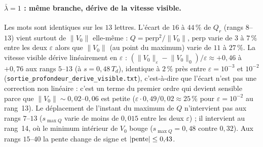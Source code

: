 \documentclass[11pt,a4paper]{article}
\theoremstyle{remark}
\newcommand{\norm}[1]{\lVert #1\rVert}
\begin{document}
\paragraph{$\bar\lambda=1$ : m\^eme branche, d\'erive de la vitesse visible.} Les mots sont identiques sur les $13$ lettres. L'\'ecart de $16$ \`a $44\,\%$ de $Q_r$ (rangs $8$--$13$) vient surtout de $\norm{V_0}$ elle-m\^eme : $Q=\mathrm{perp}^2/\norm{V_0}$, $\mathrm{perp}$ varie de $3$ \`a $7\,\%$ entre les deux $\varepsilon$ alors que $\norm{V_0}$ (au point du maximum) varie de $11$ \`a $27\,\%$. La vitesse visible d\'erive lin\'eairement en $\varepsilon$ : $(\norm{V_0}_\varepsilon-\norm{V_0}_0)/\varepsilon\approx+0{,}46$ \`a $+0{,}76$ aux rangs $5$--$13$ (\`a $s=0{,}48\,T_d$), identique \`a $2\,\%$ pr\`es entre $\varepsilon=10^{-3}$ et $10^{-2}$ (\texttt{sortie\_profondeur\_derive\_visible.txt}), c'est-\`a-dire que l'\'ecart n'est pas une correction non lin\'eaire : c'est un terme du premier ordre qui devient sensible parce que $\norm{V_0}\sim0{,}02$--$0{,}06$ est petite ($\varepsilon\cdot0{,}49/0{,}02\approx25\,\%$ pour $\varepsilon=10^{-2}$ au rang~13). Le d\'eplacement de l'instant du maximum de $Q$ n'intervient pas aux rangs $7$--$13$ ($s_{\max Q}$ varie de moins de $0{,}015$ entre les deux $\varepsilon$) ; il intervient au rang~14, o\`u le minimum int\'erieur de $V_0$ bouge ($s_{\max Q}=0{,}48$ contre $0{,}32$). Aux rangs $15$--$40$ la pente change de signe et $|{\rm pente}|\le0{,}43$.
\end{document}
